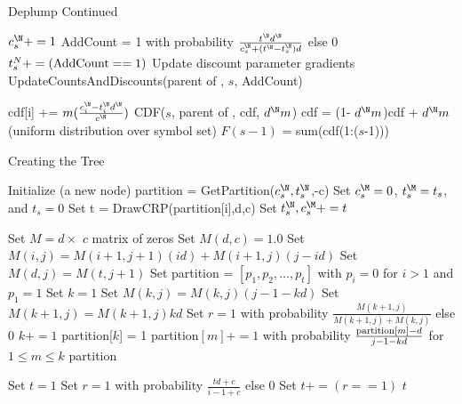 \begin{algorithm}
    \caption{Deplump Continued}
    \begin{algorithmic}[1]
    
			\State $c^\N_s += 1$
			\State AddCount = 1 with probability $\frac{t^\N d^\N}{c^\N_s + (t^\N - t^\N_s)d}$ else 0 
			\State $t^N_s += ({\rm AddCount} == 1)$
		\EndIf
		\State Update discount parameter gradients
		\State UpdateCountsAndDiscounts(parent of \N, $s$, AddCount)
	\EndFunction	


			\State cdf[i] += $m(\frac{c^\N_i - t^\N_i d^\N}{c^\N})$
		\EndFor
			\State \Return CDF($s$, parent of \N, cdf, $d^\N m$)
		\Else
			\State cdf = (1- $d^\N m$)cdf + $d^\N m$(uniform distribution over symbol set) 
			\State $F(s-1)$ = sum(cdf(1:($s$-1)))
			\State \Return [$F(s-1), F(s) = F(s-1)$ + cdf($s$)]
		\EndIf 
	\EndFunction
    \end{algorithmic}
\end{algorithm}

\begin{algorithm}
	\begin{algorithmic}[1]
	\caption{Creating the Tree}
	
		\State Initialize \M (a new node)
			\State partition = GetPartition($c^\N_s, t^\N_s$,-c)
			\State Set $c^\M_s = 0$, $t^\M_s = t_s$, and $t_s = 0$
				\State Set t = DrawCRP(partition[i],d,c)
				\State Set $t^\N_s, c^\M_s += t$
			\EndFor
		\EndFor
	\EndFunction
	
		\State Set $M =  d \times$ $c$ matrix of zeros
		\State Set $M(d,c) = 1.0$
				\State Set $M(i,j) = M(i +1, j+1)(id)  + M(i+1,j)(j - id)$ 
			\EndFor
			\State Set $M(d,j) = M(t,j+1)$
		\EndFor
		\State Set partition = $[p_1, p_2, \ldots, p_t]$ with $p_i = 0$ for $i >1$ and $p_1 = 1$
		\State Set $k = 1$
			\State Set $M(k,j) = M(k,j)(j-1 -k d)$
			\State Set $M(k+1,j) = M(k+1,j)kd$
			\State Set $r = 1$ with probability $\frac{M(k+1,j)}{M(k+1,j) + M(k,j)}$ else 0
				\State $k += 1$
				\State partition[$k$] = 1
			\Else
				\State partition$[m] += 1$ with probability $\frac{{\rm partition}[m] - d}{j-1 -kd}$ for $1 \leq m \leq k$
			\EndIf
		\EndFor
		\State \Return partition
	\EndFunction
	
		\State Set $t = 1$
			\State Set $r = 1$ with probability $\frac{td + c}{i-1 + c}$ else 0
			\State Set $t += (r == 1)$
		\EndFor
		\State \Return $t$
	\EndFunction
	
	\end{algorithmic}	
\end{algorithm}